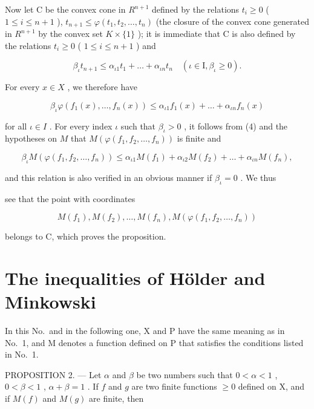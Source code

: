 Now let C be the convex cone in \(R^{n+1}\) defined by the relations \(t_{i} \geqslant 0\) ( \(1 \leqslant i \leqslant n + 1\) ), \(t_{n+1} \leqslant \varphi(t_{1}, t_{2}, \ldots, t_{n})\) (the closure of the convex cone generated in \(R^{n+1}\) by the convex set \(K \times \{1\}\) ); it is immediate that C is also defined by the relations \(t_{i} \geqslant 0\) ( \(1 \leqslant i \leqslant n + 1\) ) and

\[
\beta_ {\iota} t _ {n + 1} \leqslant \alpha_ {\iota 1} t _ {1} + \dots + \alpha_ {\iota n} t _ {n} \quad (\iota \in \mathrm{I}, \beta_ {\iota} \geqslant 0).\tag{3}
\]

For every \(x \in X\) , we therefore have

\[
\beta_ {\iota} \varphi (f _ {1} (x), \dots , f _ {n} (x)) \leqslant \alpha_ {\iota 1} f _ {1} (x) + \dots + \alpha_ {\iota n} f _ {n} (x)\tag{4}
\]

for all \(\iota \in I\) . For every index \(\iota\) such that \(\beta_{\iota} > 0\) , it follows from (4) and the hypotheses on \(M\) that \(M(\varphi(f_1, f_2, \ldots, f_n))\) is finite and

\[
\beta_ {\iota} M \left(\varphi \left(f _ {1}, f _ {2}, \dots , f _ {n}\right)\right) \leqslant \alpha_ {\iota 1} M \left(f _ {1}\right) + \alpha_ {\iota 2} M \left(f _ {2}\right) + \dots + \alpha_ {\iota n} M \left(f _ {n}\right),
\]

and this relation is also verified in an obvious manner if \(\beta_{\iota} = 0\) . We thus

see that the point with coordinates

\[
M (f _ {1}), M (f _ {2}), \dots , M (f _ {n}), M (\varphi (f _ {1}, f _ {2}, \dots , f _ {n}))
\]

belongs to C, which proves the proposition.

\section{The inequalities of Hölder and Minkowski}

In this No.~and in the following one, X and P have the same meaning as in No.~1, and M denotes a function defined on P that satisfies the conditions listed in No.~1.

PROPOSITION 2. --- Let \(\alpha\) and \(\beta\) be two numbers such that \(0 < \alpha < 1\) , \(0 < \beta < 1\) , \(\alpha + \beta = 1\) . If \(f\) and \(g\) are two finite functions \(\geqslant 0\) defined on X, and if \(M(f)\) and \(M(g)\) are finite, then

